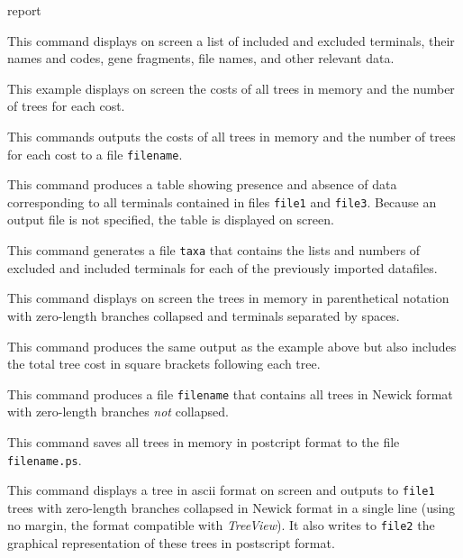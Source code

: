 \begin{command}{report}{}
\begin{poyexamples}
            {This command displays on screen a list of included and excluded terminals, their
            names and codes, gene fragments, file names, and other relevant data.}
            
            {This example displays on screen the costs of all trees in memory and the
            number of trees for each cost.}

            {This commands outputs the costs of all trees in memory and the
            number of trees for each cost to a file \texttt{filename}.}

		{This command produces a table showing presence
		and absence of data corresponding to all terminals contained
		in files \texttt{file1} and \texttt{file3}. Because an output
		file is not specified, the table is displayed on screen.}
		
		{This command generates a file \texttt{taxa} that contains the
		lists and numbers of excluded and included terminals for each of the previously
		imported datafiles.}
		
            {This command displays on screen the trees in memory in parenthetical
            notation with zero-length branches collapsed and terminals
            separated by spaces.}

            {This command produces the same output as the example above
            but also includes the total tree cost in square brackets
            following each tree.}

            {This command produces a file \texttt{filename} that contains
            all trees in Newick format with zero-length branches \emph{not}
            collapsed.}
		
            {This command saves all trees in memory in
            postcript format to the file \texttt{filename.ps}.}

		{This command displays a tree in ascii format on screen and outputs
		to \texttt{file1} trees with zero-length branches collapsed in Newick format
		in a single line (using no margin, the format compatible with \emph{TreeView}). It
		also writes to \texttt{file2} the graphical representation of these trees in
		postscript format.}


\end{poyexamples}
\end{command}
